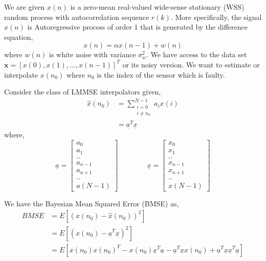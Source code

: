 \documentclass[a4 paper]{article}
\begin{document}
\setlength{\abovedisplayskip}{3pt}
\setlength{\belowdisplayskip}{3pt}


We are given $x(n)$ is a zero-mean real-valued wide-sense stationary (WSS) random process with autocorrelation sequence $ r(k)$. More specifically, the signal $x(n)$ is Autoregressive process of order 1 that is generated by the difference equation,
\begin{equation*}
x(n) = \alpha x(n - 1) + w(n)
\end{equation*}
where $w(n)$ is white noise with variance $\sigma_{w}^{2}$. We have access to the data set $\mathbf{x} = [x(0), x(1), ..., x(n -1)]^{T}$ or its noisy version. We want to estimate or interpolate $x(n_{0})$ where $n_{0}$ is the index of the sensor which is faulty.

\solution Consider the class of LMMSE interpolators given,
\begin{align*}
	\hat{x}(n_{0}) &= \sum_{\substack{i = 0 \\ i \neq n_{0}}}^{N - 1} a_{i}x(i) \\
		&= \underline{a}^{T} \underline{x}
\end{align*}
where,
\[
\underline{a} = 
\begin{bmatrix}
	a_{0}	\\ a_{1}	\\ ..	\\ a_{n-1}	\\ a_{n+1}	\\ ..	\\	a(N-1)
\end{bmatrix}
\hspace{4em}
\underline{x} = 
\begin{bmatrix}
	x_{0}	\\ x_{1}	\\ ..	\\ x_{n-1}	\\ x_{n+1}	\\ ..	\\	x(N-1)
\end{bmatrix}
\]

We have the Bayesian Mean Squared Error (BMSE) as,
\begin{align*}
	BMSE &= E[(x(n_{0}) - \hat{x}(n_{0}))^{2}]	\\
		&= E[(x(n_{0}) - \underline{a}^{T} \underline{x})^{2}]	\\
		&= E[x(n_{0})x(n_{0})^{T} - x(n_{0})\underline{x}^{T}\underline{a} - \underline{a}^{T}\underline{x} x(n_{0}) + \underline{a}^{T}\underline{x}\underline{x}^{T}\underline{a}]
\end{align*}
\end{document}

